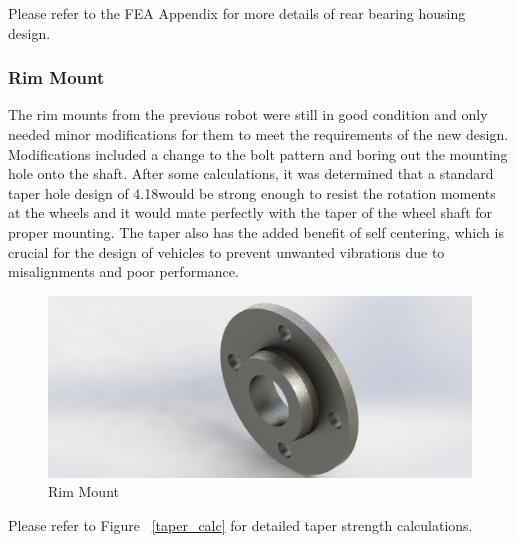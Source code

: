 Please refer to the FEA Appendix for more details of rear bearing housing design.

\subsubsection{Rim Mount}
The rim mounts from the previous robot were still in good condition and only needed minor modifications for them to meet the requirements of the new design. Modifications included a change to the bolt pattern and boring out the mounting hole onto the shaft. After some calculations, it was determined that a standard taper hole design of 4.18\degree would be strong enough to resist the rotation moments at the wheels and it would mate perfectly with the taper of the wheel shaft for proper mounting. The taper also has the added benefit of self centering, which is crucial for the design of vehicles to prevent unwanted vibrations due to misalignments and poor performance.

\begin{figure}[h]\centering
	\includegraphics[width=.7\linewidth]{dom/rim_mount_iso_rndr.jpg}
	\caption{Rim Mount}
	\label{fig:rim_mount}
\end{figure}
 

Please refer to Figure ~\ref{taper_calc} for detailed taper strength calculations.
